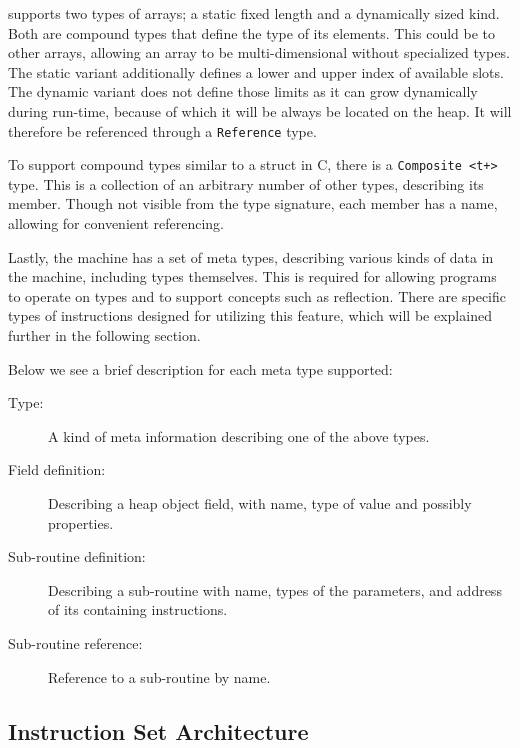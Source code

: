 
\thename{} supports two types of arrays; a static fixed length and a dynamically
sized kind. Both are compound types that define the type of its elements. This
could be to other arrays, allowing an array to be multi-dimensional without
specialized types. The static variant additionally defines a lower and upper
index of available slots. The dynamic variant does not define those limits as it
can grow dynamically during run-time, because of which it will be always be
located on the heap. It will therefore be referenced through a {\tt Reference}
type.


To support compound types similar to a struct in C, there is a {\tt Composite
  <t+>} type. This is a collection of an arbitrary number of other types,
describing its member. Though not visible from the type signature, each member
has a name, allowing for convenient referencing.


Lastly, the machine has a set of meta types, describing various kinds of data in
the machine, including types themselves. This is required for allowing programs
to operate on types and to support concepts such as reflection. There are
specific types of instructions designed for utilizing this feature, which will be
explained further in the following section.

Below we see a brief description for each meta type supported:

\begin{description}
\item[Type:] A kind of meta information describing one of the above types.

\item[Field definition:] Describing a heap object field, with name, type of
  value and possibly properties.

\item[Sub-routine definition:] Describing a sub-routine with name, types of the
  parameters, and address of its containing instructions.

\item[Sub-routine reference:] Reference to a sub-routine by name.

\end{description}

\subsection{Instruction Set Architecture}
\label{sec:design:isa}

